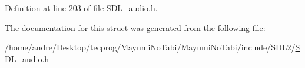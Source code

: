 Definition at line 203 of file S\-D\-L\-\_\-audio.\-h.



The documentation for this struct was generated from the following file\-:\begin{DoxyCompactItemize}
\item 
/home/andre/\-Desktop/tecprog/\-Mayumi\-No\-Tabi/\-Mayumi\-No\-Tabi/include/\-S\-D\-L2/\hyperlink{_s_d_l__audio_8h}{S\-D\-L\-\_\-audio.\-h}\end{DoxyCompactItemize}
